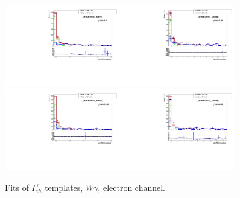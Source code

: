 \begin{figure}[htb]
\begin{center}
   \includegraphics[width=0.45\textwidth]{../figs/figs_v11/ELECTRON_WGamma/TemplateFits/c_TEMPL_CHISO_UNblind__phoEt55to65__Barrel__RooFit.pdf}\includegraphics[width=0.45\textwidth]{../figs/figs_v11/ELECTRON_WGamma/TemplateFits/c_TEMPL_CHISO_UNblind__phoEt55to65__Endcap__RooFit.pdf}\\
   \includegraphics[width=0.45\textwidth]{../figs/figs_v11/ELECTRON_WGamma/TemplateFits/c_TEMPL_CHISO_UNblind__phoEt65to75__Barrel__RooFit.pdf}\includegraphics[width=0.45\textwidth]{../figs/figs_v11/ELECTRON_WGamma/TemplateFits/c_TEMPL_CHISO_UNblind__phoEt65to75__Endcap__RooFit.pdf}\\
  \label{fig:templateFits_CHISO_ELECTRON_2}
  \caption{Fits of $I_{ch}^{\gamma}$ templates, $W\gamma$, electron channel.}
  \end{center}
\end{figure}

